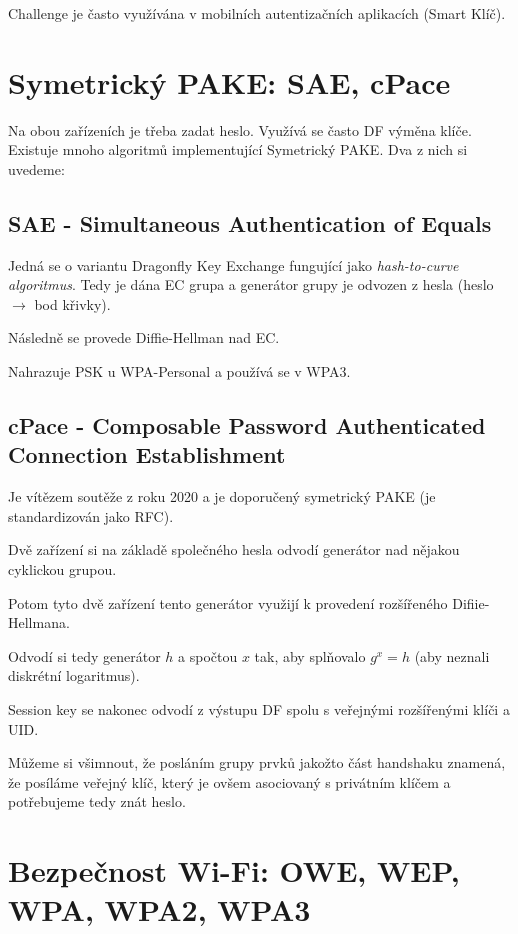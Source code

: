 \documentclass[10pt,a4paper]{article}
\begin{document}
Challenge je často využívána v mobilních autentizačních aplikacích (Smart Klíč).



\section{Symetrický PAKE: SAE, cPace}

Na obou zařízeních je třeba zadat heslo. Využívá se často DF výměna klíče. Existuje mnoho algoritmů implementující Symetrický PAKE. Dva z nich si uvedeme:

\subsection{SAE - Simultaneous Authentication of Equals}

Jedná se o variantu Dragonfly Key Exchange fungující jako \textit{hash-to-curve algoritmus}. 
Tedy je dána EC grupa a generátor grupy je odvozen z hesla (heslo $ \to $ bod křivky).

Následně se provede Diffie-Hellman nad EC.

Nahrazuje PSK u WPA-Personal a používá se v WPA3.

\subsection{cPace - Composable Password Authenticated Connection Establishment}

Je vítězem soutěže z roku 2020 a je doporučený symetrický PAKE (je standardizován jako RFC).

Dvě zařízení si na základě společného hesla odvodí generátor nad nějakou cyklickou grupou.

Potom tyto dvě zařízení tento generátor využijí k provedení rozšířeného Difiie-Hellmana.

Odvodí si tedy generátor $h$ a spočtou $x$ tak, aby splňovalo $ g^x = h $ (aby neznali diskrétní logaritmus).

Session key se nakonec odvodí z výstupu DF spolu s veřejnými rozšířenými klíči a UID.

Můžeme si všimnout, že posláním grupy prvků jakožto část handshaku znamená, že posíláme veřejný klíč, který je ovšem asociovaný s privátním klíčem a potřebujeme tedy znát heslo.


\section{Bezpečnost Wi-Fi: OWE, WEP, WPA, WPA2, WPA3}
\end{document}
